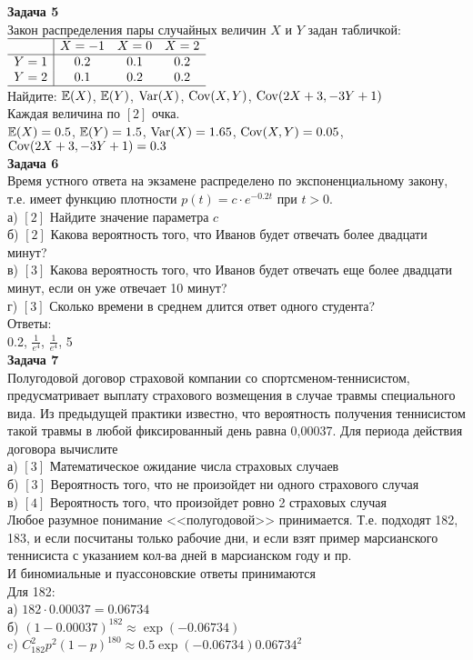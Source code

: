 \documentclass[pdftex,12pt,a4paper]{article}
\begin{document}
\textbf{Задача 5} \\
Закон распределения пары случайных величин $X$ и $Y$ задан табличкой: \\
$\begin{array}{c|ccc}
\hline
 & X=-1 & X=0 & X=2 \\
\hline
Y=1 & 0.2 & 0.1 & 0.2 \\
Y=2 & 0.1 & 0.2 & 0.2 \\
\hline
\end{array}$ \\
Найдите: $\mathbb{E}(X)$, $\mathbb{E}(Y)$, $\operatorname{Var}(X)$, $\operatorname{Cov}(X,Y)$, $\operatorname{Cov}(2X+3,-3Y+1)$ \\
Каждая величина по $[2]$ очка. \\
$\mathbb{E}(X)=0.5$, $\mathbb{E}(Y)=1.5$, $\operatorname{Var}(X)=1.65$, $\operatorname{Cov}(X,Y)=0.05$, $\operatorname{Cov}(2X+3,-3Y+1)=0.3$ \\

\textbf{Задача 6} \\ %
Время устного ответа на экзамене распределено по экспоненциальному закону, т.е. имеет функцию плотности $p(t)=c\cdot e^{-0.2t}$ при $t>0$. \\
а) $[2]$ Найдите значение параметра $c$ \\
б) $[2]$ Какова вероятность того, что Иванов будет отвечать более двадцати минут? \\
в) $[3]$ Какова вероятность того, что Иванов будет отвечать еще более двадцати минут, если он уже отвечает 10 минут? \\
г) $[3]$ Сколько времени в среднем длится ответ одного студента? \\
Ответы: \\
0.2, $\frac{1}{e^4}$, $\frac{1}{e^4}$, 5 \\

\textbf{Задача 7} \\ %
Полугодовой договор страховой компании со спортсменом-теннисистом, предусматривает выплату страхового возмещения  в случае травмы специального вида. Из предыдущей практики известно, что вероятность получения теннисистом такой травмы  в любой фиксированный день равна 0,00037. Для периода действия договора вычислите \\
а) $[3]$ Математическое ожидание числа страховых случаев \\
б) $[3]$ Вероятность того, что не произойдет ни одного страхового случая \\
в) $[4]$ Вероятность того, что произойдет ровно 2 страховых случая \\
Любое разумное понимание <<полугодовой>> принимается. Т.е. подходят 182, 183, и если посчитаны только рабочие дни, и если взят пример марсианского теннисиста с указанием кол-ва дней в марсианском году и пр. \\
И биномиальные и пуассоновские ответы принимаются \\
Для 182: \\
а) $182\cdot 0.00037=0.06734$  \\
б) $(1-0.00037)^182\approx \exp(-0.06734)$ \\
c) $C_{182}^{2}p^{2}(1-p)^{180}\approx 0.5\exp(-0.06734)0.06734^2$ 
\end{document}
